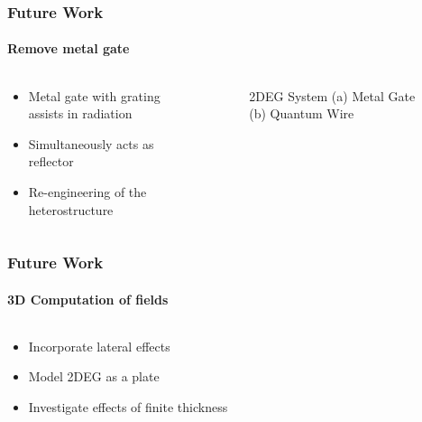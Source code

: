 \documentclass[mathserif,18pt,xcolor=table]{beamer}
\begin{document}
\begin{frame}
  \frametitle{Future Work}
  \framesubtitle{Remove metal gate}
  \begin{columns}[T] %
    \begin{column}{.5\textwidth}
      \begin{itemize}
        \item Metal gate with grating assists in radiation
        \item Simultaneously acts as reflector
        \item Re-engineering of the heterostructure
      \end{itemize}
    \end{column}
    \begin{column}[T]{.5\textwidth}
      \begin{figure}
        \vspace*{-2cm}
        \centering
        \hfil
        \caption{2DEG System (a) Metal Gate (b) Quantum Wire}
        \label{fig:dispSSS}
      \end{figure}
    \end{column}%
  \end{columns}
\end{frame}
\begin{frame}
\frametitle{Future Work}
\framesubtitle{3D Computation of fields}
\begin{columns}[T] %
  \begin{column}{.5\textwidth}
    \begin{itemize}
      \item Incorporate lateral effects
      \item Model 2DEG as a plate
      \item Investigate effects of finite thickness
    \end{itemize}
  \end{column}
  \begin{column}[T]{.5\textwidth}
    \begin{figure}
      \centering
      \def\svgwidth{1\linewidth}
      
    \end{figure}
  \end{column}%
\end{columns}
\end{frame}
\end{document}
